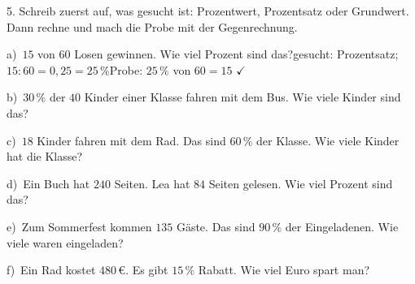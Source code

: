 \documentclass[11pt]{article}
\newcommand{\grau}[1]{{\color{mbgrau}#1}}
\begin{document}
\begin{pfaufg}{}{5.}{}
Schreib zuerst auf, was gesucht ist: Prozentwert, Prozentsatz oder Grundwert. Dann rechne und mach die Probe mit der Gegenrechnung.\par\medskip
\grau{a)\ $15$ von $60$ Losen gewinnen. Wie viel Prozent sind das?\quad gesucht: Prozentsatz; $15 : 60 = 0{,}25 = 25\,\%$\quad Probe: $25\,\%$ von $60 = 15$ $\checkmark$}\par\medskip
\noindent\begin{minipage}[t]{0.48\linewidth}
b)\ $30\,\%$ der $40$ Kinder einer Klasse fahren mit dem Bus. Wie viele Kinder sind das?
\end{minipage}\hfill
\begin{minipage}[t]{0.48\linewidth}
c)\ $18$ Kinder fahren mit dem Rad. Das sind $60\,\%$ der Klasse. Wie viele Kinder hat die Klasse?
\end{minipage}
\noindent\begin{minipage}[t]{0.48\linewidth}
d)\ Ein Buch hat $240$ Seiten. Lea hat $84$ Seiten gelesen. Wie viel Prozent sind das?
\end{minipage}\hfill
\begin{minipage}[t]{0.48\linewidth}
e)\ Zum Sommerfest kommen $135$ Gäste. Das sind $90\,\%$ der Eingeladenen. Wie viele waren eingeladen?
\end{minipage}
\noindent\begin{minipage}[t]{0.48\linewidth}
f)\ Ein Rad kostet $480\,€$. Es gibt $15\,\%$ Rabatt. Wie viel Euro spart man?
\end{minipage}
\end{pfaufg}
\end{document}
